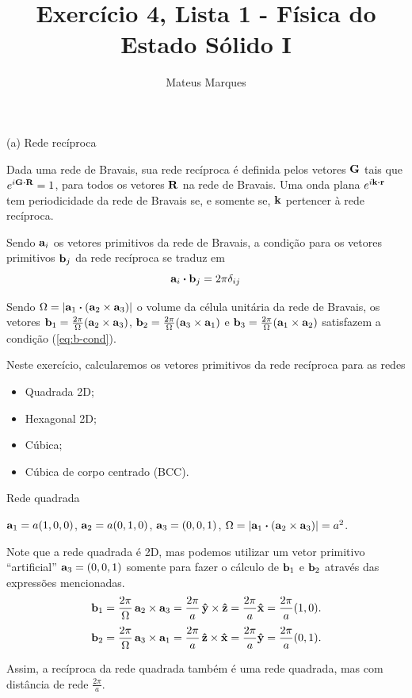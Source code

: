 \documentclass[aspectratio=169]{beamer}
\title[Exercício 4, Lista 1 - Física do Estado Sólido I]{\LARGE{Exercício 4, Lista 1 - Física do Estado Sólido I}}
\author[Mateus Marques]{\large{Mateus Marques}}
\institute[]{\small{Instituto de Física da Universidade de São Paulo}}
\begin{document}
\begin{frame}
  \titlepage
\end{frame}


\begin{frame}{(a) Rede recíproca}

Dada uma rede de Bravais, sua rede recíproca é definida pelos vetores $\vb{G}$ tais que $e^{i \vb{G} \vdot \vb{R}} = 1$, para todos os vetores $\vb{R}$ na rede de Bravais. Uma onda plana $e^{i \k \vdot \r}$ tem periodicidade da rede de Bravais se, e somente se, $\vb{k}$ pertencer à rede recíproca.

\n

Sendo $\vb{a}_i$ os vetores primitivos da rede de Bravais, a condição para os vetores primitivos $\vb{b}_j$ da rede recíproca se traduz em
\begin{equation} \label{eq:b-cond}
\a_i \vdot \b_j = 2\pi \delta_{ij}
\end{equation}

\n

Sendo $\Omega = \abs{\a_1 \vdot (\a_2 \times \a_3)}$ o volume da célula unitária da rede de Bravais, os vetores $\vb{b}_1 = \frac{2\pi}{\Omega} (\vb{a}_2 \times \vb{a}_3)$, $\vb{b}_2 = \frac{2\pi}{\Omega} (\vb{a}_3 \times \vb{a}_1)$ e $\vb{b}_3 = \frac{2\pi}{\Omega} (\vb{a}_1 \times \vb{a}_2)$ satisfazem a condição (\ref{eq:b-cond}).

\n

Neste exercício, calcularemos os vetores primitivos da rede recíproca para as redes
\begin{itemize}
\item Quadrada 2D;
\item Hexagonal 2D;
\item Cúbica;
\item Cúbica de corpo centrado (BCC).
\end{itemize}

\end{frame}




\begin{frame}{Rede quadrada}

$\vb{a}_1 = a(1,0,0)$, $\vb{a}_2 = a(0,1,0)$, $\vb{a}_3 = (0,0,1)$, $\Omega = \abs{\a_1 \vdot (\a_2 \times \a_3)} = a^2$.

\n

Note que a rede quadrada é 2D, mas podemos utilizar um vetor primitivo ``artificial'' $\vb{a}_3 = (0,0,1)$ somente para fazer o cálculo de $\vb{b}_1$ e $\vb{b}_2$ através das expressões mencionadas.
$$
\vb{b}_1 = \frac{2\pi}{\Omega} \, \vb{a}_2 \times \vb{a}_3 = \frac{2\pi}{a} \, \vu{y} \times \vu{z} = \frac{2\pi}{a} \vu{x} = \frac{2\pi}{a} (1, 0).
$$
$$
\vb{b}_2 = \frac{2\pi}{\Omega} \, \vb{a}_3 \times \vb{a}_1 = \frac{2\pi}{a} \, \vu{z} \times \vu{x} = \frac{2\pi}{a} \vu{y} = \frac{2\pi}{a} (0, 1).
$$

Assim, a recíproca da rede quadrada também é uma rede quadrada, mas com distância de rede $\frac{2\pi}{a}$.

\end{frame}
\end{document}
